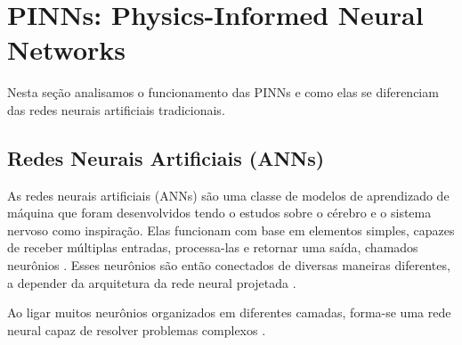 \section{PINNs: Physics-Informed Neural Networks}

Nesta seção analisamos o funcionamento das PINNs e como elas se diferenciam das redes neurais artificiais tradicionais.

\subsection{Redes Neurais Artificiais (ANNs)}

As redes neurais artificiais (ANNs) são uma classe de modelos de aprendizado de máquina que foram desenvolvidos tendo o estudos sobre o cérebro e o sistema nervoso como inspiração. Elas funcionam com base em elementos simples, capazes de receber múltiplas entradas, processa-las e retornar uma saída, chamados neurônios \cite{riad_mania_bouchaou_najjar_2004}. Esses neurônios são então conectados de diversas maneiras diferentes, a depender da arquitetura da rede neural projetada \cite{mu_sun_2022}.


Ao ligar muitos neurônios organizados em diferentes camadas, forma-se uma rede neural capaz de resolver problemas complexos \cite{krenker_bester_kos_2011}.

